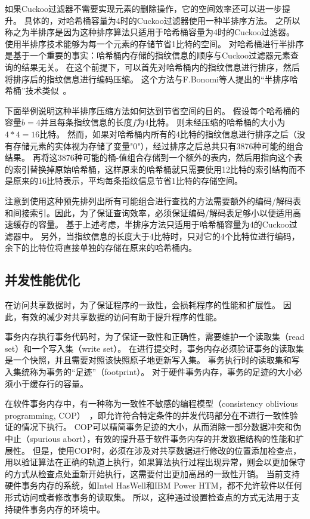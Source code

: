 如果Cuckoo过滤器不需要实现元素的删除操作，它的空间效率还可以进一步提升。
具体的，对哈希桶容量为4时的Cuckoo过滤器使用一种半排序方法。
之所以称之为半排序是因为这种排序算法只适用于哈希桶容量为4时的Cuckoo过滤器。
使用半排序技术能够为每一个元素的存储节省1比特的空间。
对哈希桶进行半排序是基于一个重要的事实：哈希桶内存储的指纹信息的顺序与Cuckoo过滤器元素查询的结果无关。
在这个前提下，可以首先对哈希桶内的指纹信息进行排序，然后将排序后的指纹信息进行编码压缩。
这个方法与F.Bonomi等人提出的“半排序哈希桶”技术类似~\cite{bonomi2006improved}。

下面举例说明这种半排序压缩方法如何达到节省空间的目的。
假设每个哈希桶的容量$b = 4$并且每条指纹信息的长度$f$为4比特。
则未经压缩的哈希桶的大小为$4*4 = 16$比特。
然而，如果对哈希桶内所有的4比特的指纹信息进行排序之后（没有存储元素的实体视为存储了变量"0"），经过排序之后总共只有3876种可能的组合结果。
再将这3876种可能的桶-值组合存储到一个额外的表内，然后用指向这个表的索引替换掉原始哈希桶，这样原来的哈希桶就只需要使用12比特的索引结构而不是原来的16比特表示，平均每条指纹信息节省1比特的存储空间。

注意到使用这种预先排列出所有可能组合进行查找的方法需要额外的编码/解码表和间接索引。因此，为了保证查询效率，必须保证编码/解码表足够小以便适用高速缓存的容量。
基于上述考虑，半排序方法只适用于哈希桶容量为4的Cuckoo过滤器中。
另外，当指纹信息的长度大于4比特时，只对它的4个比特位进行编码，余下的比特位将直接单独的存储在原来的哈希桶内。

\subsection{并发性能优化}
在访问共享数据时，为了保证程序的一致性，会损耗程序的性能和扩展性。
因此，有效的减少对共享数据的访问有助于提升程序的性能。

事务内存执行事务代码时，为了保证一致性和正确性，需要维护一个读取集（read set）和一个写入集（write set）。
在进行提交时，事务内存必须验证事务的读取集是一个快照，并且需要对照该快照原子地更新写入集\cite{dalessandro2010norec,dice2006transactional}。
事务执行时的读取集和写入集统称为事务的“足迹”（footprint）\cite{avni2014improving}。
对于硬件事务内存，事务的足迹的大小必须小于缓存行的容量。

在软件事务内存中，有一种称为一致性不敏感的编程模型（consistency oblivious programming, COP）~\cite{afek2011towards}，即允许符合特定条件的并发代码部分在不进行一致性验证的情况下执行。
COP可以精简事务足迹的大小，从而消除一部分数据冲突和伪中止（spurious abort），有效的提升基于软件事务内存的并发数据结构的性能和扩展性。
但是，使用COP时，必须在涉及对共享数据进行修改的位置添加检查点，用以验证算法在正确的轨道上执行，如果算法执行过程出现异常，则会以更加保守的方式从检查点处重新开始执行，这需要付出更加高昂的一致性开销。
当前支持硬件事务内存的系统，如Intel HasWell和IBM Power HTM，都不允许软件以任何形式访问或者修改事务的读取集。
所以，这种通过设置检查点的方式无法用于支持硬件事务内存的环境中。

